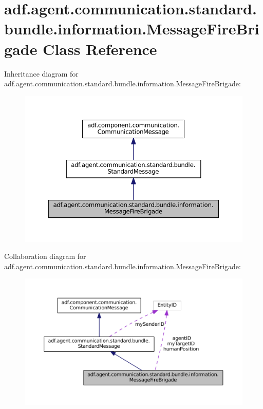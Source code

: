 \hypertarget{classadf_1_1agent_1_1communication_1_1standard_1_1bundle_1_1information_1_1MessageFireBrigade}{}\section{adf.\+agent.\+communication.\+standard.\+bundle.\+information.\+Message\+Fire\+Brigade Class Reference}
\label{classadf_1_1agent_1_1communication_1_1standard_1_1bundle_1_1information_1_1MessageFireBrigade}


Inheritance diagram for adf.\+agent.\+communication.\+standard.\+bundle.\+information.\+Message\+Fire\+Brigade\+:
\nopagebreak
\begin{figure}[H]
\begin{center}
\leavevmode
\includegraphics[width=350pt]{classadf_1_1agent_1_1communication_1_1standard_1_1bundle_1_1information_1_1MessageFireBrigade__inherit__graph}
\end{center}
\end{figure}


Collaboration diagram for adf.\+agent.\+communication.\+standard.\+bundle.\+information.\+Message\+Fire\+Brigade\+:
\nopagebreak
\begin{figure}[H]
\begin{center}
\leavevmode
\includegraphics[width=350pt]{classadf_1_1agent_1_1communication_1_1standard_1_1bundle_1_1information_1_1MessageFireBrigade__coll__graph}
\end{center}
\end{figure}
